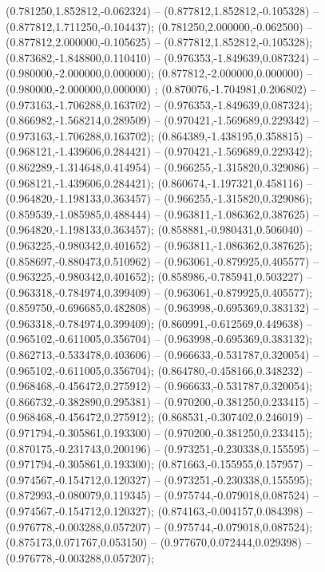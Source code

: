  (0.781250,1.852812,-0.062324) -- (0.877812,1.852812,-0.105328) -- (0.877812,1.711250,-0.104437);
 (0.781250,2.000000,-0.062500) -- (0.877812,2.000000,-0.105625) -- (0.877812,1.852812,-0.105328);
 (0.873682,-1.848800,0.110410) -- (0.976353,-1.849639,0.087324) -- (0.980000,-2.000000,0.000000);
 (0.877812,-2.000000,0.000000) -- (0.980000,-2.000000,0.000000) ;
 (0.870076,-1.704981,0.206802) -- (0.973163,-1.706288,0.163702) -- (0.976353,-1.849639,0.087324);
 (0.866982,-1.568214,0.289509) -- (0.970421,-1.569689,0.229342) -- (0.973163,-1.706288,0.163702);
 (0.864389,-1.438195,0.358815) -- (0.968121,-1.439606,0.284421) -- (0.970421,-1.569689,0.229342);
 (0.862289,-1.314648,0.414954) -- (0.966255,-1.315820,0.329086) -- (0.968121,-1.439606,0.284421);
 (0.860674,-1.197321,0.458116) -- (0.964820,-1.198133,0.363457) -- (0.966255,-1.315820,0.329086);
 (0.859539,-1.085985,0.488444) -- (0.963811,-1.086362,0.387625) -- (0.964820,-1.198133,0.363457);
 (0.858881,-0.980431,0.506040) -- (0.963225,-0.980342,0.401652) -- (0.963811,-1.086362,0.387625);
 (0.858697,-0.880473,0.510962) -- (0.963061,-0.879925,0.405577) -- (0.963225,-0.980342,0.401652);
 (0.858986,-0.785941,0.503227) -- (0.963318,-0.784974,0.399409) -- (0.963061,-0.879925,0.405577);
 (0.859750,-0.696685,0.482808) -- (0.963998,-0.695369,0.383132) -- (0.963318,-0.784974,0.399409);
 (0.860991,-0.612569,0.449638) -- (0.965102,-0.611005,0.356704) -- (0.963998,-0.695369,0.383132);
 (0.862713,-0.533478,0.403606) -- (0.966633,-0.531787,0.320054) -- (0.965102,-0.611005,0.356704);
 (0.864780,-0.458166,0.348232) -- (0.968468,-0.456472,0.275912) -- (0.966633,-0.531787,0.320054);
 (0.866732,-0.382890,0.295381) -- (0.970200,-0.381250,0.233415) -- (0.968468,-0.456472,0.275912);
 (0.868531,-0.307402,0.246019) -- (0.971794,-0.305861,0.193300) -- (0.970200,-0.381250,0.233415);
 (0.870175,-0.231743,0.200196) -- (0.973251,-0.230338,0.155595) -- (0.971794,-0.305861,0.193300);
 (0.871663,-0.155955,0.157957) -- (0.974567,-0.154712,0.120327) -- (0.973251,-0.230338,0.155595);
 (0.872993,-0.080079,0.119345) -- (0.975744,-0.079018,0.087524) -- (0.974567,-0.154712,0.120327);
 (0.874163,-0.004157,0.084398) -- (0.976778,-0.003288,0.057207) -- (0.975744,-0.079018,0.087524);
 (0.875173,0.071767,0.053150) -- (0.977670,0.072444,0.029398) -- (0.976778,-0.003288,0.057207);
